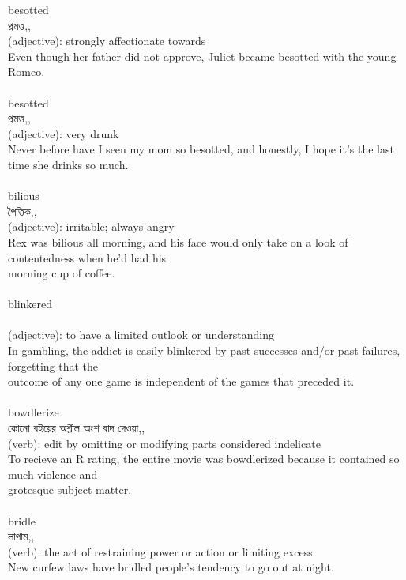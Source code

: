 \documentclass{article}
\begin{document}
{besotted}\\
{প্রমত্ত,,}\\
{(adjective): strongly affectionate towards\\Even though her father did not approve, Juliet became besotted with the young Romeo.\\}\\
{besotted}\\
{প্রমত্ত,,}\\
{(adjective): very drunk\\Never before have I seen my mom so besotted, and honestly, I hope it's the last time she drinks so much.\\}\\
{bilious}\\
{পৈত্তিক,,}\\
{(adjective): irritable; always angry\\Rex was bilious all morning, and his face would only take on a look of contentedness when he'd had his\\morning cup of coffee.\\}\\
{blinkered}\\
{}\\
{(adjective): to have a limited outlook or understanding\\In gambling, the addict is easily blinkered by past successes and/or past failures, forgetting that the\\outcome of any one game is independent of the games that preceded it.\\}\\
{bowdlerize}\\
{কোনো বইয়ের অশ্লীল অংশ বাদ দেওয়া,,}\\
{(verb): edit by omitting or modifying parts considered indelicate\\To recieve an R rating, the entire movie was bowdlerized because it contained so much violence and\\grotesque subject matter.\\}\\
{bridle}\\
{লাগাম,,}\\
{(verb): the act of restraining power or action or limiting excess\\New curfew laws have bridled people's tendency to go out at night.\\\\                                                                                  \\}\\
\end{document}
